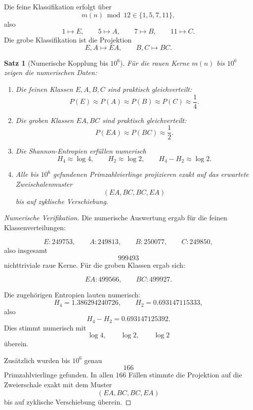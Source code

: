 \documentclass[11pt,a4paper]{article}
\newtheorem{satz}{Satz}
\theoremstyle{definition}
\theoremstyle{remark}
\begin{document}
	Die feine Klassifikation erfolgt über
	\[
	m(n)\bmod 12\in\{1,5,7,11\},
	\]
	also
	\[
	1\mapsto E,\qquad
	5\mapsto A,\qquad
	7\mapsto B,\qquad
	11\mapsto C.
	\]
	Die grobe Klassifikation ist die Projektion
	\[
	E,A\mapsto EA,
	\qquad
	B,C\mapsto BC.
	\]
	
	\begin{satz}[Numerische Kopplung bis \(10^6\)]
		\label{satz:numerik_kopplung_vierer_zweier}
		Für die rauen Kerne \(m(n)\) bis \(10^6\) zeigen die numerischen Daten:
		
		\begin{enumerate}
			\item Die feinen Klassen \(E,A,B,C\) sind praktisch gleichverteilt:
			\[
			P(E)\approx P(A)\approx P(B)\approx P(C)\approx \frac14.
			\]
			
			\item Die groben Klassen \(EA,BC\) sind praktisch gleichverteilt:
			\[
			P(EA)\approx P(BC)\approx \frac12.
			\]
			
			\item Die Shannon-Entropien erfüllen numerisch
			\[
			H_4\approx \log 4,
			\qquad
			H_2\approx \log 2,
			\qquad
			H_4-H_2\approx \log 2.
			\]
			
			\item Alle bis \(10^6\) gefundenen Primzahlvierlinge projizieren exakt auf das
			erwartete Zweischalenmuster
			\[
			(EA,BC,BC,EA)
			\]
			bis auf zyklische Verschiebung.
		\end{enumerate}
	\end{satz}
	
	\begin{proof}[Numerische Verifikation]
		Die numerische Auswertung ergab für die feinen Klassenverteilungen:
		
		\[
		E: 249753,\qquad
		A: 249813,\qquad
		B: 250077,\qquad
		C: 249850,
		\]
		also insgesamt
		\[
		999493
		\]
		nichttriviale raue Kerne. Für die groben Klassen ergab sich:
		
		\[
		EA: 499566,\qquad
		BC: 499927.
		\]
		
		Die zugehörigen Entropien lauten numerisch:
		\[
		H_4=1.386294240726,
		\qquad
		H_2=0.693147115333,
		\]
		also
		\[
		H_4-H_2=0.693147125392.
		\]
		Dies stimmt numerisch mit
		\[
		\log 4,\qquad \log 2,\qquad \log 2
		\]
		überein.
		
		Zusätzlich wurden bis \(10^6\) genau
		\[
		166
		\]
		Primzahlvierlinge gefunden. In allen \(166\) Fällen stimmte die Projektion auf die
		Zweierschale exakt mit dem Muster
		\[
		(EA,BC,BC,EA)
		\]
		bis auf zyklische Verschiebung überein.
	\end{proof}
	
\end{document}
